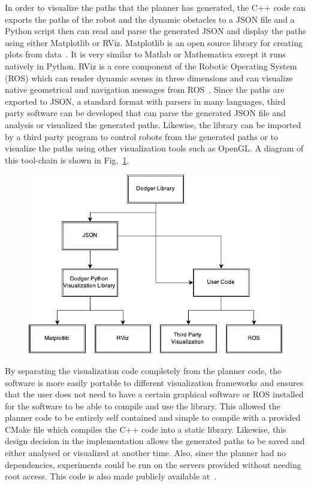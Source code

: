 In order to visualize the paths that the planner has generated, the C++ code
can exports the paths of the robot and the dynamic obstacles to a JSON file and
a Python script then can read and parse the generated JSON and display the
paths using either Matplotlib or RViz. Matplotlib is an open source library for
creating plots from data~\cite{matplotlib}. It is very similar to Matlab or
Mathematica except it runs natively in Python. RViz is a core component of the
Robotic Operating System (ROS) which can render dynamic scenes in three
dimensions and can visualize native geometrical and navigation messages from
ROS~\cite{ros}.  Since the paths are exported to JSON, a standard format with
parsers in many languages, third party software can be developed that can parse
the generated JSON file and analysis or visualized the generated paths.
Likewise, the \Name library can be imported by a third party program to control
robots from the generated paths or to visualize the paths using other
visualization tools such as OpenGL. A diagram of this tool-chain is shown in
Fig.~\ref{fig:software}.


\begin{figure}[h!]

    \centering

    \includegraphics[width=0.8\linewidth]{figs/toolchain}

    \caption{}

    \label{fig:software}

\end{figure}

By separating the visualization code completely from the planner code, the
software is more easily portable to different visualization frameworks and
ensures that the user does not need to have a certain graphical software or ROS
installed for the software to be able to compile and use the library. This
allowed the planner code to be entirely self contained and simple to compile
with a provided CMake file which compiles the C++ code into a static library.
Likewise, this design decision in the implementation allows the generated paths
to be saved and either analysed or visualized at another time.  Also, since the
planner had no dependencies, experiments could be run on the servers provided
without needing root access.  This code is also made publicly available
at~\cite{dodger}.


